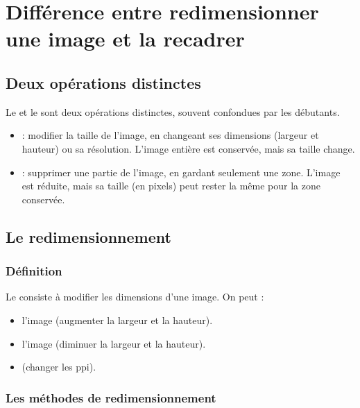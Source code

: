 \section{Différence entre redimensionner une image et la recadrer}

\subsection{Deux opérations distinctes}

Le  et le  sont deux opérations distinctes, souvent confondues par les débutants.

\begin{itemize}
    \item {} : modifier la taille de l'image, en changeant ses dimensions (largeur et hauteur) ou sa résolution. L'image entière est conservée, mais sa taille change.
    \item {} : supprimer une partie de l'image, en gardant seulement une zone. L'image est réduite, mais sa taille (en pixels) peut rester la même pour la zone conservée.
\end{itemize}

\subsection{Le redimensionnement}

\subsubsection{Définition}

Le  consiste à modifier les dimensions d'une image. On peut :

\begin{itemize}
    \item {} l'image (augmenter la largeur et la hauteur).
    \item {} l'image (diminuer la largeur et la hauteur).
    \item {} (changer les ppi).
\end{itemize}

\subsubsection{Les méthodes de redimensionnement}

